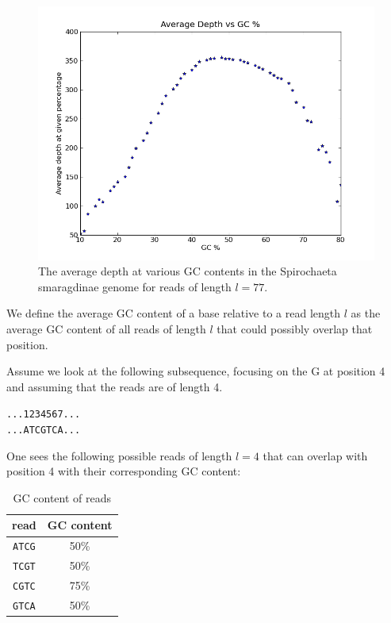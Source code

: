 \documentclass[phd,tocprelim]{cornell}
\begin{document}
\begin{figure}[!tpb]%
    \centerline{\includegraphics[width=\textwidth]{figures/ALE/avgDepthVsGC.png}}
    \caption[Average depth vs. GC content]{The average depth at various GC contents in the Spirochaeta smaragdinae genome for reads of length $l = 77$.}\label{fig:GC1}
\end{figure}

We define the average GC content of a base relative to a read length $l$ as the average GC content of all reads of length $l$ that could possibly overlap that position.

Assume we look at the following subsequence, focusing on the G at position 4 and assuming that the reads are of length 4.

\singlespacing
\begin{center}
\texttt{...1234567...\\
...ATCGTCA...}
\end{center}
\normalspacing

One sees the following possible reads of length $l=4$ that can overlap with position 4 with their corresponding GC content:

\begin{table}[h]
    \caption{GC content of reads}
\begin{center}
\begin{tabular}{c|c}
    read & GC content \\
    \hline
    \texttt{ATCG} & 50\% \\
    \texttt{TCGT} & 50\% \\
    \texttt{CGTC} & 75\% \\
    \texttt{GTCA} & 50\%
\end{tabular}
\end{center}
\end{table}
\end{document}
